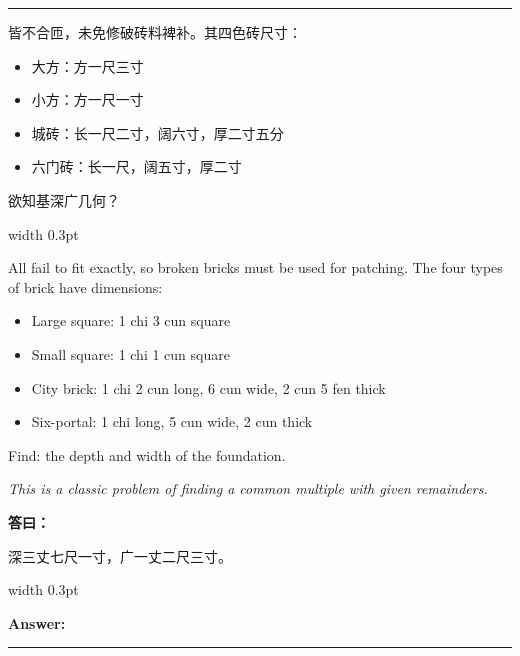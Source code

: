 \documentclass[10pt,a4paper]{article}
\newcommand{\cnlabel}[1]{\textcolor{labelcolor}{\textbf{#1}}}
\newcommand{\enlabel}[1]{\textcolor{labelcolor}{\textbf{#1}}}
\newenvironment{problemsection}{%
  \medskip\par\noindent\textcolor{rulecolor}{\rule{\textwidth}{0.4pt}}\par\smallskip%
}{\par\smallskip\noindent\textcolor{rulecolor}{\rule{\textwidth}{0.4pt}}\par\medskip}
\begin{document}
\begin{problemsection}
\vspace{0.3em}

\noindent\begin{minipage}[t]{0.47\textwidth}
\begin{flushleft}
\small
皆不合匝，未免修破砖料裨补。其四色砖尺寸：
\begin{itemize}[leftmargin=*,nosep,topsep=2pt]
  \item 大方：方一尺三寸
  \item 小方：方一尺一寸
  \item 城砖：长一尺二寸，阔六寸，厚二寸五分
  \item 六门砖：长一尺，阔五寸，厚二寸
\end{itemize}

欲知基深广几何？
\end{flushleft}
\end{minipage}%
\hfill\vrule width 0.3pt\hfill%
\begin{minipage}[t]{0.47\textwidth}
\begin{flushleft}
\small
All fail to fit exactly, so broken bricks must be used for patching. The four types of brick have dimensions:
\begin{itemize}[leftmargin=*,nosep,topsep=2pt]
  \item Large square: 1 chi 3 cun square
  \item Small square: 1 chi 1 cun square
  \item City brick: 1 chi 2 cun long, 6 cun wide, 2 cun 5 fen thick
  \item Six-portal: 1 chi long, 5 cun wide, 2 cun thick
\end{itemize}

Find: the depth and width of the foundation.

\textit{This is a classic problem of finding a common multiple with given remainders.}
\end{flushleft}
\end{minipage}

\vspace{0.3em}

\noindent\begin{minipage}[t]{0.47\textwidth}
\begin{flushleft}
\small
\cnlabel{答曰：}

深三丈七尺一寸，广一丈二尺三寸。
\end{flushleft}
\end{minipage}%
\hfill\vrule width 0.3pt\hfill%
\begin{minipage}[t]{0.47\textwidth}
\begin{flushleft}
\small
\enlabel{Answer:}


\end{flushleft}
\end{minipage}
\end{problemsection}
\end{document}
